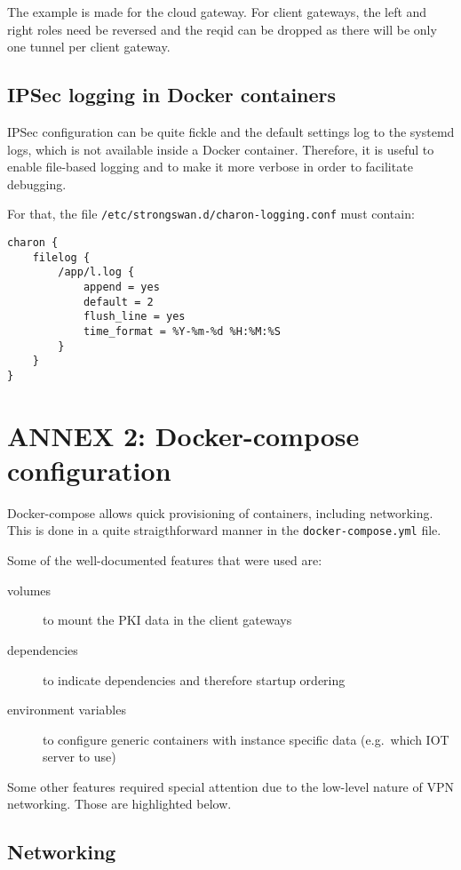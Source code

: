 \documentclass[paper=a4, fontsize=11pt]{scrartcl}
\begin{document}
The example is made for the cloud gateway.
For client gateways, the left and right roles need be reversed and the reqid can
be dropped as there will be only one tunnel per client gateway.

\subsection{IPSec logging in Docker containers}

IPSec configuration can be quite fickle and the default settings log to the
systemd logs, which is not available inside a Docker container.
Therefore, it is useful to enable file-based logging and to make it more verbose
in order to facilitate debugging.

For that, the file \texttt{/etc/strongswan.d/charon-logging.conf} must contain:

\begin{lstlisting}
charon {
    filelog {
        /app/l.log {
            append = yes
            default = 2
            flush_line = yes
            time_format = %Y-%m-%d %H:%M:%S
        }
    }
}
\end{lstlisting}

\newpage{}

\section{ANNEX 2: Docker-compose configuration}\label{dkc}

Docker-compose allows quick provisioning of containers, including networking.
This is done in a quite straigthforward manner in the
\texttt{docker-compose.yml} file.

Some of the well-documented features that were used are:
\begin{description}
    \item [volumes] to mount the PKI data in the client gateways
    \item [dependencies] to indicate dependencies and therefore startup
        ordering
    \item [environment variables] to configure generic containers with instance
        specific data (e.g.\ which IOT server to use)
\end{description}

Some other features required special attention due to the low-level nature of
VPN networking.
Those are highlighted below.

\subsection{Networking}
\end{document}
